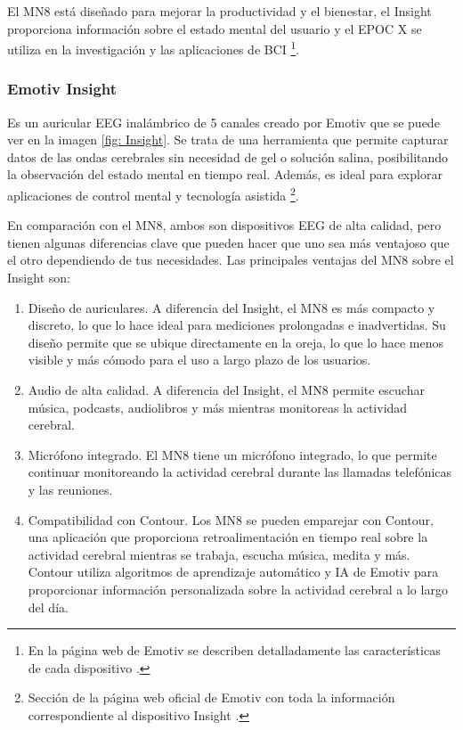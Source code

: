 El MN8 está diseñado para mejorar la productividad y el bienestar, el Insight proporciona información sobre el estado mental del usuario y el EPOC X se utiliza en la investigación y las aplicaciones de BCI \cite{comparacionHeadsets}\footnote{En la página web de Emotiv se describen detalladamente las características de cada dispositivo \cite{comparacionHeadsets}.}.

\subsubsection{Emotiv Insight}
Es un auricular EEG inalámbrico de 5 canales creado por Emotiv que se puede ver en la imagen \ref{fig: Insight}. Se trata de una herramienta que permite capturar datos de las ondas cerebrales sin necesidad de gel o solución salina, posibilitando la observación del estado mental en tiempo real. Además, es ideal para explorar aplicaciones de control mental y tecnología asistida \cite{EmotivInsight}\footnote{Sección de la página web oficial de Emotiv con toda la información correspondiente al dispositivo Insight \cite{EmotivInsight}.}.

En comparación con el MN8, ambos son dispositivos EEG de alta calidad, pero tienen algunas diferencias clave que pueden hacer que uno sea más ventajoso que el otro dependiendo de tus necesidades. Las principales ventajas del MN8 sobre el Insight son:

\begin{enumerate}
    \item Diseño de auriculares. A diferencia del Insight, el MN8 es más compacto y discreto, lo que lo hace ideal para mediciones prolongadas e inadvertidas. Su diseño permite que se ubique directamente en la oreja, lo que lo hace menos visible y más cómodo para el uso a largo plazo de los usuarios.
    \item Audio de alta calidad. A diferencia del Insight, el MN8 permite escuchar música, podcasts, audiolibros y más mientras monitoreas la actividad cerebral.
    \item Micrófono integrado. El MN8 tiene un micrófono integrado, lo que permite continuar monitoreando la actividad cerebral durante las llamadas telefónicas y las reuniones.
    \item Compatibilidad con Contour. Los MN8 se pueden emparejar con Contour, una aplicación que proporciona retroalimentación en tiempo real sobre la actividad cerebral mientras se trabaja, escucha música, medita y más. Contour utiliza algoritmos de aprendizaje automático y IA de Emotiv para proporcionar información personalizada sobre la actividad cerebral a lo largo del día.
\end{enumerate}

